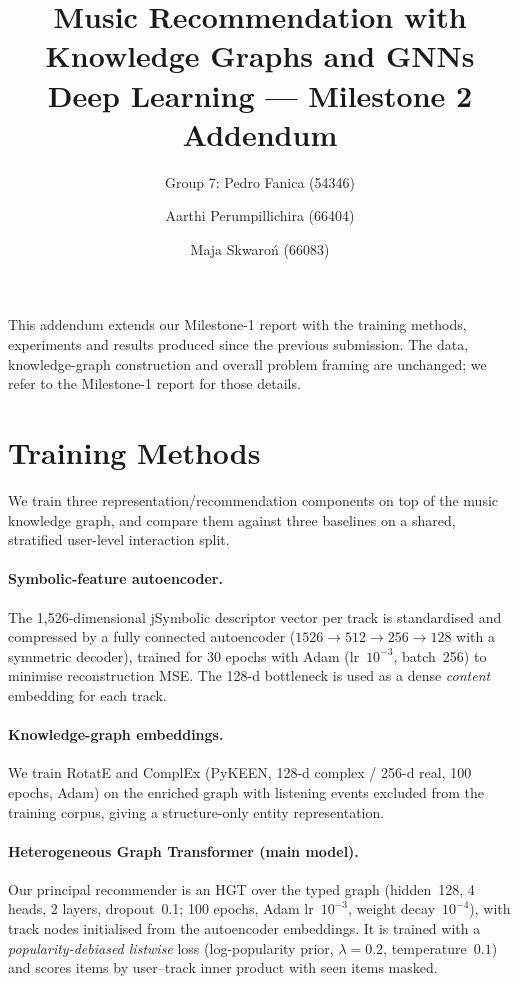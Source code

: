\documentclass[10pt,twocolumn,letterpaper]{article}
\title{Music Recommendation with Knowledge Graphs and GNNs\\
\large Deep Learning --- Milestone 2 Addendum}
\author{Group 7: Pedro Fanica (54346) \and
Aarthi Perumpillichira (66404) \and Maja Skwaro\'n (66083)}
\begin{document}
\maketitle

This addendum extends our Milestone-1 report with the training methods,
experiments and results produced since the previous submission. The data,
knowledge-graph construction and overall problem framing are unchanged; we
refer to the Milestone-1 report for those details.

\section{Training Methods}

We train three representation/recommendation components on top of the music
knowledge graph, and compare them against three baselines on a shared,
stratified user-level interaction split.

\paragraph{Symbolic-feature autoencoder.}
The 1{,}526-dimensional jSymbolic descriptor vector per track is standardised
and compressed by a fully connected autoencoder
($1526\!\rightarrow\!512\!\rightarrow\!256\!\rightarrow\!128$ with a symmetric
decoder), trained for 30 epochs with Adam (lr~$10^{-3}$, batch~256) to minimise
reconstruction MSE. The 128-d bottleneck is used as a dense \emph{content}
embedding for each track.

\paragraph{Knowledge-graph embeddings.}
We train RotatE and ComplEx (PyKEEN, 128-d complex / 256-d real, 100 epochs,
Adam) on the enriched graph with listening events excluded from the training
corpus, giving a structure-only entity representation.

\paragraph{Heterogeneous Graph Transformer (main model).}
Our principal recommender is an HGT over the typed graph (hidden~128, 4 heads,
2 layers, dropout~0.1; 100 epochs, Adam lr~$10^{-3}$, weight decay~$10^{-4}$),
with track nodes initialised from the autoencoder embeddings. It is trained
with a \emph{popularity-debiased listwise} loss (log-popularity prior,
$\lambda=0.2$, temperature~$0.1$) and scores items by user--track inner product
with seen items masked.
\end{document}
